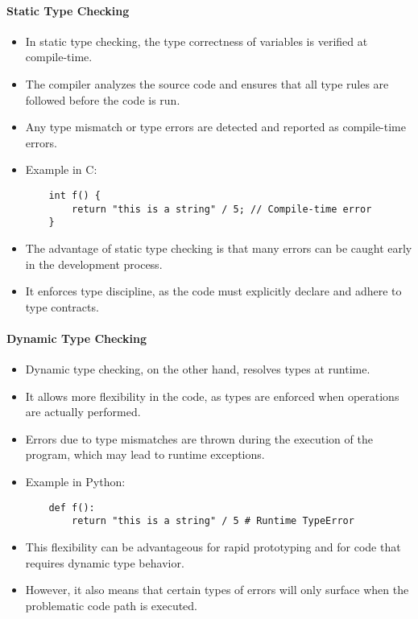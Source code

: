 \documentclass[12pt]{article}
\begin{document}
\paragraph{Static Type Checking}
\begin{itemize}
    \item In static type checking, the type correctness of variables is verified at compile-time.
    \item The compiler analyzes the source code and ensures that all type rules are followed before the code is run.
    \item Any type mismatch or type errors are detected and reported as compile-time errors.
    \item Example in C:
    \begin{lstlisting}
    int f() {
        return "this is a string" / 5; // Compile-time error
    }
    \end{lstlisting}
    \item The advantage of static type checking is that many errors can be caught early in the development process.
    \item It enforces type discipline, as the code must explicitly declare and adhere to type contracts.
\end{itemize}

\paragraph{Dynamic Type Checking}
\begin{itemize}
    \item Dynamic type checking, on the other hand, resolves types at runtime.
    \item It allows more flexibility in the code, as types are enforced when operations are actually performed.
    \item Errors due to type mismatches are thrown during the execution of the program, which may lead to runtime exceptions.
    \item Example in Python:
    \begin{lstlisting}
    def f():
        return "this is a string" / 5 # Runtime TypeError
    \end{lstlisting}
    \item This flexibility can be advantageous for rapid prototyping and for code that requires dynamic type behavior.
    \item However, it also means that certain types of errors will only surface when the problematic code path is executed.
\end{itemize}
\end{document}
